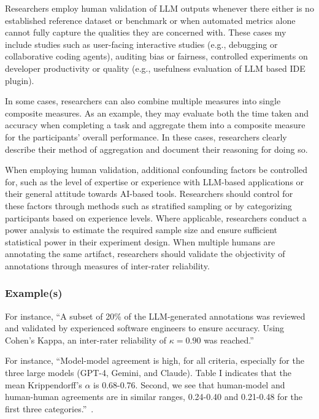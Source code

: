 Researchers \should employ human validation of LLM outputs whenever there either is no established reference dataset or benchmark or when automated metrics alone cannot fully capture the qualities they are concerned with.
These cases my include studies such as user-facing interactive studies (e.g., debugging or collaborative coding agents), auditing bias or fairness, controlled experiments on developer productivity or quality (e.g., usefulness evaluation of LLM based IDE plugin).

In some cases, researchers can also combine multiple measures into single composite measures.
As an example, they may evaluate both the time taken and accuracy when completing a task and aggregate them into a composite measure for the participants' overall performance.
In these cases, researchers \should clearly describe their method of aggregation and document their reasoning for doing so.

When employing human validation, additional confounding factors \should be controlled for, such as the level of expertise or experience with LLM-based applications or their general attitude towards AI-based tools.
Researchers should control for these factors through methods such as stratified sampling or by categorizing participants based on experience levels.
Where applicable, researchers \should conduct a power analysis to estimate the required sample size and ensure sufficient statistical power in their experiment design.
When multiple humans are annotating the same artifact, researchers should validate the objectivity of annotations through measures of inter-rater reliability.

\subsubsection{Example(s)}

For instance, ``A subset of 20\% of the LLM-generated annotations was reviewed and validated by experienced software engineers to ensure accuracy. Using Cohen's Kappa, an inter-rater reliability of $\kappa = 0.90$ was reached.'' 

For instance, ``Model-model agreement is high, for all criteria, especially for the three large models (GPT-4, Gemini, and Claude). Table I indicates that the mean Krippendorff’s $\alpha$ is 0.68-0.76. 
Second, we see that human-model and human-human agreements are in similar ranges, 0.24-0.40 and 0.21-0.48
for the first three categories.''~\cite{DBLP:journals/corr/abs-2408-05534}.

